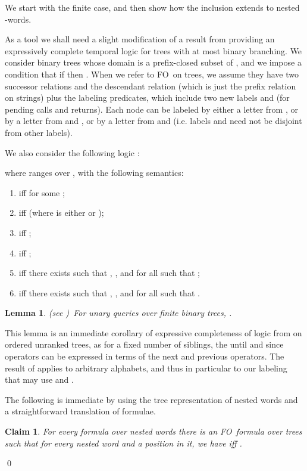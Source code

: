 \documentclass{LMCS}
\newcommand{\aProof}[2]{\vspace{2mm}{\noindent\em Proof of
#1.~}#2\qed}
\newcommand{\FO}{{\rm FO}}
\theoremstyle{plain}
\newtheorem{lemma}[theorem]{Lemma}
\newtheorem{claim}[theorem]{Claim}
\theoremstyle{definition}
\begin{document}
\aProof{Lemma \ref{nwtl-lemma-two}}{We start with the finite case,
and then show how the inclusion extends to nested -words.

As a tool we shall need a slight modification of a result from
\cite{Schl92,marx-pods04} providing an expressively complete temporal
logic for trees with at most binary branching.  We consider binary
trees whose domain  is a prefix-closed subset of , and
we impose a condition that if  then .
When we refer to \FO\ on trees, we assume they have two successor
relations  and the descendant relation  (which is
just the prefix relation on strings) plus the labeling predicates,
which include two new labels  and  (for pending calls
and returns). Each node can be labeled 
by either a letter from , or by a letter from  and
, or by a letter from  and  (i.e. labels
 and  need not be disjoint from other labels).


We also consider the following logic :

where  ranges over , with the following semantics:
\begin{enumerate}[]
\item  iff  for some ;
\item  iff  (where
   is either  or );
\item  iff ;
\item  iff ;
\item  iff there exists  such that , , and  for all
   such that ;
\item  iff there exists  such that , , and  for all
   such that .
\end{enumerate}

\begin{lemma}
\label{marx-lemma}
(see \cite{marx-pods04})\ For unary queries over finite binary trees,
.
\end{lemma}

This lemma is an immediate corollary of expressive completeness of
logic  from \cite{marx-pods04} on
ordered unranked trees, as for a fixed number of siblings, the until
and since operators can be expressed in terms of the next and previous
operators. The result of \cite{marx-pods04} applies to arbitrary
alphabets, and thus in particular to our labeling that may use
 and .

The following is immediate by using the tree representation of nested
words and a straightforward
translation of formulae. 

\begin{claim}
\label{fo-to-fo-claim}
For every  formula  over nested words there is an \FO\
formula  over trees such that for every nested word  and
a position  in it, we have  iff
. 
\end{claim}


}
\end{document}
